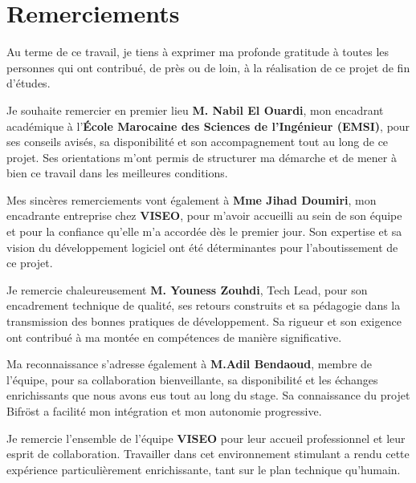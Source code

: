 \chapter*{Remerciements}
\thispagestyle{empty}

Au terme de ce travail, je tiens \`a exprimer ma profonde gratitude \`a toutes les personnes qui ont contribu\'e, de pr\`es ou de loin, \`a la r\'ealisation de ce projet de fin d'\'etudes.

\vspace{0.5cm}

Je souhaite remercier en premier lieu \textbf{M. Nabil El Ouardi}, mon encadrant acad\'emique \`a l'\textbf{\'Ecole Marocaine des Sciences de l'Ing\'enieur (EMSI)}, pour ses conseils avis\'es, sa disponibilit\'e et son accompagnement tout au long de ce projet. Ses orientations m'ont permis de structurer ma d\'emarche et de mener \`a bien ce travail dans les meilleures conditions.

\vspace{0.5cm}

Mes sinc\`eres remerciements vont \'egalement \`a \textbf{Mme Jihad Doumiri}, mon encadrante entreprise chez \textbf{VISEO}, pour m'avoir accueilli au sein de son \'equipe et pour la confiance qu'elle m'a accord\'ee d\`es le premier jour. Son expertise et sa vision du d\'eveloppement logiciel ont \'et\'e d\'eterminantes pour l'aboutissement de ce projet.

\vspace{0.5cm}

Je remercie chaleureusement \textbf{M. Youness Zouhdi}, Tech Lead, pour son encadrement technique de qualit\'e, ses retours construits et sa p\'edagogie dans la transmission des bonnes pratiques de d\'eveloppement. Sa rigueur et son exigence ont contribu\'e \`a ma mont\'ee en comp\'etences de mani\`ere significative.

\vspace{0.5cm}

Ma reconnaissance s'adresse \'egalement \`a \textbf{M.Adil Bendaoud}, membre de l'\'equipe, pour sa collaboration bienveillante, sa disponibilit\'e et les \'echanges enrichissants que nous avons eus tout au long du stage. Sa connaissance du projet Bifr\"ost a facilit\'e mon int\'egration et mon autonomie progressive.

\vspace{0.5cm}

Je remercie l'ensemble de l'\'equipe \textbf{VISEO} pour leur accueil professionnel et leur esprit de collaboration. Travailler dans cet environnement stimulant a rendu cette exp\'erience particuli\`erement enrichissante, tant sur le plan technique qu'humain.

